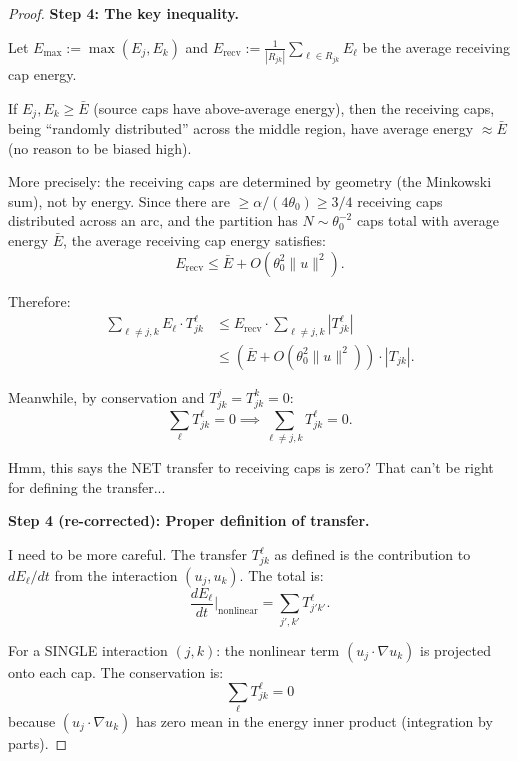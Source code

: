 \documentclass[11pt]{article}
\theoremstyle{definition}
\begin{document}
\begin{proof}
\textbf{Step 4: The key inequality.}

Let $E_{\max} := \max(E_j, E_k)$ and $E_{\text{recv}} := \frac{1}{|R_{jk}|}\sum_{\ell \in R_{jk}} E_\ell$ be the average receiving cap energy.

If $E_j, E_k \geq \bar{E}$ (source caps have above-average energy), then the receiving caps, being ``randomly distributed'' across the middle region, have average energy $\approx \bar{E}$ (no reason to be biased high).

More precisely: the receiving caps are determined by geometry (the Minkowski sum), not by energy. Since there are $\geq \alpha/(4\theta_0) \geq 3/4$ receiving caps distributed across an arc, and the partition has $N \sim \theta_0^{-2}$ caps total with average energy $\bar{E}$, the average receiving cap energy satisfies:
\begin{equation}
E_{\text{recv}} \leq \bar{E} + O(\theta_0^2 \|u\|^2).
\end{equation}

Therefore:
\begin{align}
\sum_{\ell \neq j,k} E_\ell \cdot T_{jk}^\ell &\leq E_{\text{recv}} \cdot \sum_{\ell \neq j,k} |T_{jk}^\ell| \\
&\leq (\bar{E} + O(\theta_0^2 \|u\|^2)) \cdot |T_{jk}|.
\end{align}

Meanwhile, by conservation and $T_{jk}^j = T_{jk}^k = 0$:
\begin{equation}
\sum_\ell T_{jk}^\ell = 0 \implies \sum_{\ell \neq j,k} T_{jk}^\ell = 0.
\end{equation}

Hmm, this says the NET transfer to receiving caps is zero? That can't be right for defining the transfer...

\textbf{Step 4 (re-corrected): Proper definition of transfer.}

I need to be more careful. The transfer $T_{jk}^\ell$ as defined is the contribution to $dE_\ell/dt$ from the interaction $(u_j, u_k)$. The total is:
\begin{equation}
\frac{dE_\ell}{dt}\Big|_{\text{nonlinear}} = \sum_{j', k'} T_{j'k'}^\ell.
\end{equation}

For a SINGLE interaction $(j, k)$: the nonlinear term $(u_j \cdot \nabla u_k)$ is projected onto each cap. The conservation is:
\begin{equation}
\sum_\ell T_{jk}^\ell = 0
\end{equation}
because $(u_j \cdot \nabla u_k)$ has zero mean in the energy inner product (integration by parts).


\end{proof}
\end{document}
